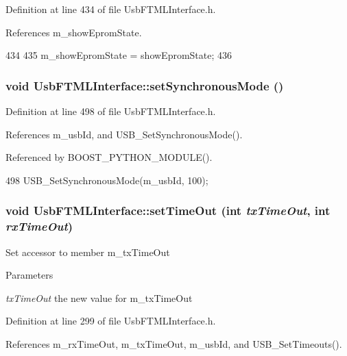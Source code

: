 Definition at line 434 of file UsbFTMLInterface.h.

References m\_\-showEpromState.


\begin{DoxyCode}
434                                                {
435     m_showEpromState = showEpromState;
436   }
\end{DoxyCode}
\hypertarget{classUsbFTMLInterface_a8aa032fbbaf9d0adbeea2d147d7c8a14}{
\subsubsection[{setSynchronousMode}]{\setlength{\rightskip}{0pt plus 5cm}void UsbFTMLInterface::setSynchronousMode ()}}
\label{classUsbFTMLInterface_a8aa032fbbaf9d0adbeea2d147d7c8a14}


Definition at line 498 of file UsbFTMLInterface.h.

References m\_\-usbId, and USB\_\-SetSynchronousMode().

Referenced by BOOST\_\-PYTHON\_\-MODULE().


\begin{DoxyCode}
498 {USB_SetSynchronousMode(m_usbId, 100);}
\end{DoxyCode}
\hypertarget{classUsbFTMLInterface_a93f8a5e14d22d36e29ffa367d60faca5}{
\subsubsection[{setTimeOut}]{\setlength{\rightskip}{0pt plus 5cm}void UsbFTMLInterface::setTimeOut (int {\em txTimeOut}, \/  int {\em rxTimeOut})}}
\label{classUsbFTMLInterface_a93f8a5e14d22d36e29ffa367d60faca5}
Set accessor to member m\_\-txTimeOut 
\begin{DoxyParams}{Parameters}
\item[{\em txTimeOut}]the new value for m\_\-txTimeOut \end{DoxyParams}


Definition at line 299 of file UsbFTMLInterface.h.

References m\_\-rxTimeOut, m\_\-txTimeOut, m\_\-usbId, and USB\_\-SetTimeouts().


